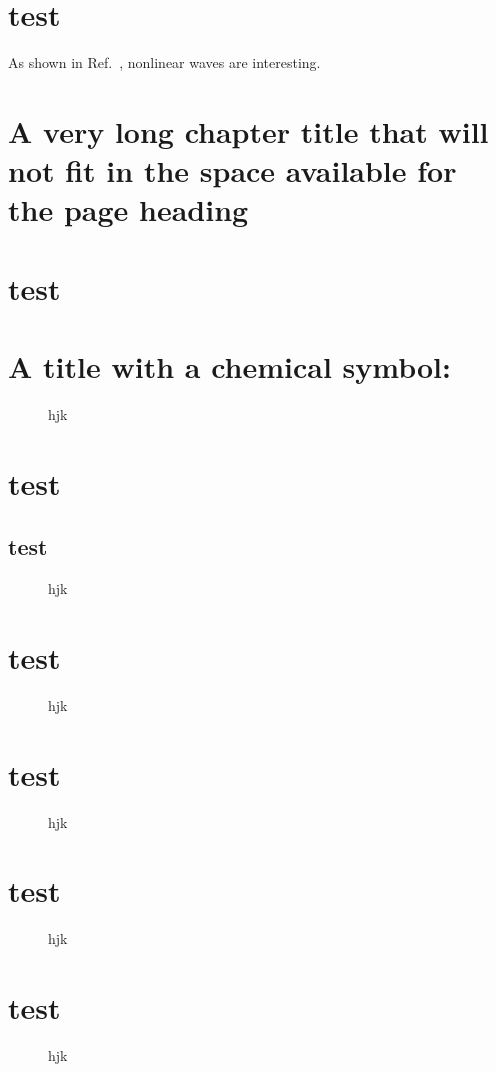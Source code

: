 \documentclass[natbib]{muthesis}
\newcommand{\bfig}{\begin{figure}}
\newcommand{\efig}{\end{figure}}
\begin{document}
\tableofcontents
\listoffigures



\chapter{test}

As shown in Ref.~\cite{APR06,MP99,ZK74}, nonlinear waves are interesting.


\chapter[Very long chapter title]
{A very long chapter title that will not fit in the
  space available for the page heading}
\chapter{test}
\chapter{A title with a chemical symbol: }
\bfig
\vspace{2cm}
\caption{hjk}
\efig
\chapter{test}
\section{test}
\bfig
\vspace{2cm}
\caption{hjk}
\efig
\chapter{test}
\bfig
\vspace{2cm}
\caption{hjk}
\efig
\chapter{test}
\bfig
\vspace{2cm}
\caption{hjk}
\efig
\chapter{test}
\bfig
\vspace{2cm}
\caption{hjk}
\efig
\chapter{test}
\bfig
\vspace{2cm}
\caption{hjk}
\efig
\end{document}
